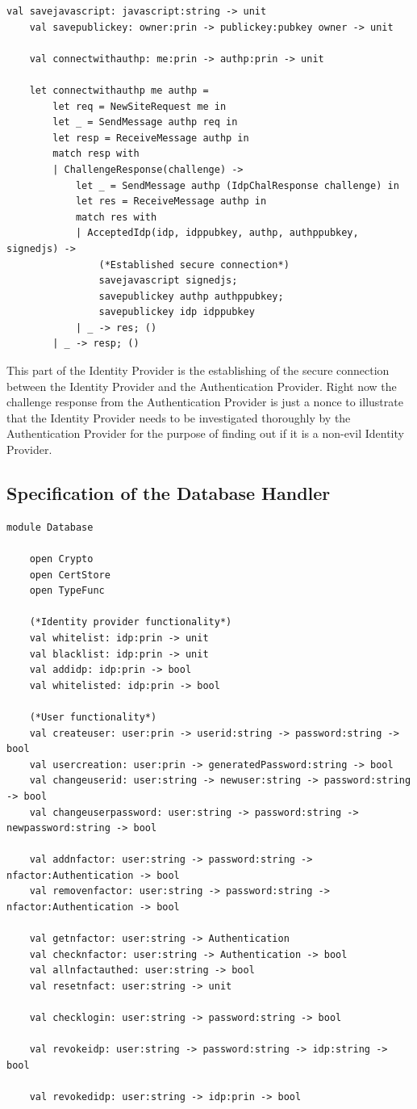 \documentclass[twosided]{report}
\begin{document}
\begin{lstlisting}[style=fstar, caption={Establising a secure connection with Authentication Provider}]
	val savejavascript: javascript:string -> unit
	val savepublickey: owner:prin -> publickey:pubkey owner -> unit

	val connectwithauthp: me:prin -> authp:prin -> unit

	let connectwithauthp me authp =
		let req = NewSiteRequest me in
		let _ = SendMessage authp req in
		let resp = ReceiveMessage authp in
		match resp with
		| ChallengeResponse(challenge) ->
			let _ = SendMessage authp (IdpChalResponse challenge) in
			let res = ReceiveMessage authp in
			match res with
			| AcceptedIdp(idp, idppubkey, authp, authppubkey, signedjs) ->
				(*Established secure connection*)
				savejavascript signedjs;
				savepublickey authp authppubkey;
				savepublickey idp idppubkey
			| _ -> res; ()
		| _ -> resp; ()
\end{lstlisting}
This part of the Identity Provider is the establishing of the secure connection between the Identity Provider and the Authentication Provider. Right now the challenge response from the Authentication Provider is just a nonce to illustrate that the Identity Provider needs to be investigated thoroughly by the Authentication Provider for the purpose of finding out if it is a non-evil Identity Provider.
\subsection{Specification of the Database Handler}

\begin{lstlisting}[style=fstar, caption={Specification of the database}]
	module Database
	
	open Crypto
	open CertStore
	open TypeFunc

	(*Identity provider functionality*)
	val whitelist: idp:prin -> unit
	val blacklist: idp:prin -> unit
	val addidp: idp:prin -> bool
	val whitelisted: idp:prin -> bool

	(*User functionality*)
	val createuser: user:prin -> userid:string -> password:string -> bool
	val usercreation: user:prin -> generatedPassword:string -> bool
	val changeuserid: user:string -> newuser:string -> password:string -> bool
	val changeuserpassword: user:string -> password:string -> newpassword:string -> bool

	val addnfactor: user:string -> password:string -> nfactor:Authentication -> bool
	val removenfactor: user:string -> password:string -> nfactor:Authentication -> bool

	val getnfactor: user:string -> Authentication
	val checknfactor: user:string -> Authentication -> bool
	val allnfactauthed: user:string -> bool
	val resetnfact: user:string -> unit

	val checklogin: user:string -> password:string -> bool

	val revokeidp: user:string -> password:string -> idp:string -> bool

	val revokedidp: user:string -> idp:prin -> bool
\end{lstlisting}
\end{document}
